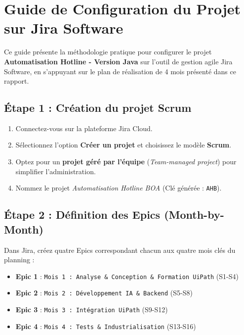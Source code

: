 \section{Guide de Configuration du Projet sur Jira Software}
\label{sec:guide_jira}

Ce guide présente la méthodologie pratique pour configurer le projet \textbf{Automatisation Hotline - Version Java} sur l'outil de gestion agile Jira Software, en s'appuyant sur le plan de réalisation de 4 mois présenté dans ce rapport.

\subsection{Étape 1 : Création du projet Scrum}
\begin{enumerate}
    \item Connectez-vous sur la plateforme Jira Cloud.
    \item Sélectionnez l'option \textbf{Créer un projet} et choisissez le modèle \textbf{Scrum}.
    \item Optez pour un \textbf{projet géré par l'équipe} (\textit{Team-managed project}) pour simplifier l'administration.
    \item Nommez le projet \textit{Automatisation Hotline BOA} (Clé générée : \texttt{AHB}).
\end{enumerate}

\subsection{Étape 2 : Définition des Epics (Month-by-Month)}
Dans Jira, créez quatre Epics correspondant chacun aux quatre mois clés du planning :
\begin{itemize}
    \item \textbf{Epic 1} : \texttt{Mois 1 : Analyse \& Conception \& Formation UiPath} (S1-S4)
    \item \textbf{Epic 2} : \texttt{Mois 2 : Développement IA \& Backend} (S5-S8)
    \item \textbf{Epic 3} : \texttt{Mois 3 : Intégration UiPath} (S9-S12)
    \item \textbf{Epic 4} : \texttt{Mois 4 : Tests \& Industrialisation} (S13-S16)
\end{itemize}

